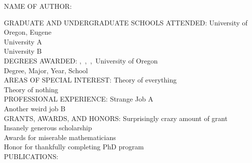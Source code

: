   \clearpage
    {%
   \thispagestyle{plain}
   \thesiscv

   \begin{SingleSpace}
   \noindent NAME OF AUTHOR: \thesisauthor
    \vspace{\cvsecskip}

    \noindent GRADUATE AND UNDERGRADUATE SCHOOLS ATTENDED:
    \vspace{\onelineskip}
    \newline
    University of Oregon, Eugene \\
    University A \\
    University B \\

    \vspace{\cvsecskip}
    \noindent DEGREES AWARDED:
    \vspace{\onelineskip}
    \newline
    \thesisdegree,\ \thesismajor,\  \thesisgradyear,\  University of Oregon \\
    Degree, Major, Year, School \\

    \vspace{\cvsecskip}
    \noindent AREAS OF SPECIAL INTEREST:
    \vspace{\onelineskip}
    \newline
    Theory of everything \\
    Theory of nothing \\

    \vspace{\cvsecskip}
    \noindent PROFESSIONAL EXPERIENCE:
    \vspace{\onelineskip}
    \newline
    Strange Job A \\
    Another weird job B \\

    \vspace{\cvsecskip}
    \noindent GRANTS, AWARDS, AND HONORS:
    \vspace{\onelineskip}
    \newline
    Surprisingly crazy amount of grant \\
    Insanely generous scholarship \\
    Awards for miserable mathematicians \\ 
    Honor for thankfully completing PhD program \\

    \vspace{\cvsecskip}
    \noindent PUBLICATIONS:
    \vspace{\onelineskip}
    \newline
     \\
     \\

   \end{SingleSpace}
   }